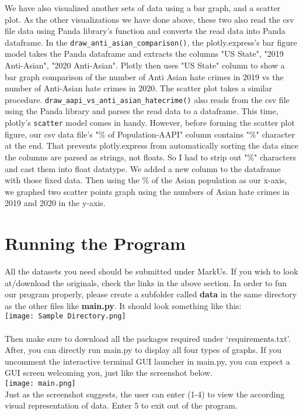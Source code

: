 \documentclass[fontsize=11pt]{article}
\begin{document}
    \quad We have also visualized another sets of data using a bar graph, and a scatter plot. As the other visualizations we have done above, these two also read the csv file data using Panda library's function and converts the read data into Panda dataframe. In the \texttt{draw\_anti\_asian\_comparison()}, the plotly.express's bar figure model takes the Panda dataframe and extracts the columns "US State", "2019 Anti-Asian", "2020 Anti-Asian". Plotly then uses "US State" column to show a bar graph comparison of the number of Anti Asian hate crimes in 2019 vs the number of Anti-Asian hate crimes in 2020. The scatter plot takes a similar procedure. \texttt{draw\_aapi\_vs\_anti\_asian\_hatecrime()} also reads from the csv file using the Panda library and parses the read data to a dataframe. This time, plotly's \texttt{scatter} model comes in handy. However, before forming the scatter plot figure, our csv data file's "\% of Population-AAPI" column contains "\%" character at the end. That prevents plotly.express from automatically sorting the data since the columns are parsed as strings, not floats. So I had to strip out "\%" characters and cast them into float datatype. We added a new column to the dataframe with those fixed data. Then using the \% of the Asian population as our x-axis, we graphed two scatter points graph using the numbers of Asian hate crimes in 2019 and 2020 in the y-axis.

\section*{Running the Program}

\quad All the datasets you need should be submitted under MarkUs. If you wish to look at/download the originals, check the links in the above section. In order to fun our program properly, please create a subfolder called \textbf{data} in the same directory as the other files like \textbf{main.py}. It should look something like this:\\ \texttt{[image: Sample Directory.png]}
\\
\\
Then make sure to download all the packages required under `requirements.txt'. After, you can directly run main.py to display all four types of graphs. If you uncomment the interactive terminal GUI launcher in main.py, you can expect a GUI screen welcoming you, just like the screenshot below.
\\
\texttt{[image: main.png]}
\\
Just as the screenshot suggests, the user can enter (1-4) to view the according visual representation of data. Enter 5 to exit out of the program.
\\
\end{document}
